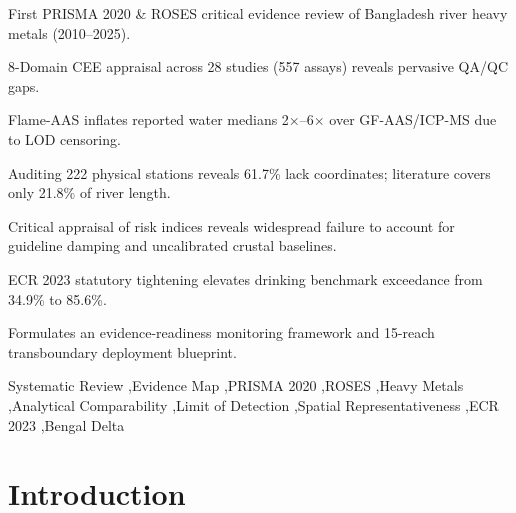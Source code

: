 \documentclass[authoryear,preprint,12pt]{elsarticle}
\begin{document}
\begin{frontmatter}
\begin{abstract}
Finally, we audit compliance under the gazetted \textit{Environmental Conservation Rules 2023} (ECR 2023 Schedule 2), which lowered the statutory drinking threshold for Pb from 0.050 to 0.010~mg/L, surging raw-water drinking benchmark exceedance from 34.9\% to \textbf{85.6\%}. We outline an operational evidence-readiness framework ($RQ5$) and a reach-prioritized 15-sector blueprint for institutional surveillance by the Department of Environment (DoE) and Bangladesh Water Development Board (BWDB).
\end{abstract}

\begin{highlights}
\item First PRISMA 2020 \& ROSES critical evidence review of Bangladesh river heavy metals (2010--2025).
\item 8-Domain CEE appraisal across 28 studies (557 assays) reveals pervasive QA/QC gaps.
\item Flame-AAS inflates reported water medians 2$\times$--6$\times$ over GF-AAS/ICP-MS due to LOD censoring.
\item Auditing 222 physical stations reveals 61.7\% lack coordinates; literature covers only 21.8\% of river length.
\item Critical appraisal of risk indices reveals widespread failure to account for guideline damping and uncalibrated crustal baselines.
\item ECR 2023 statutory tightening elevates drinking benchmark exceedance from 34.9\% to 85.6\%.
\item Formulates an evidence-readiness monitoring framework and 15-reach transboundary deployment blueprint.
\end{highlights}

\begin{keyword}
Systematic Review \sep Evidence Map \sep PRISMA 2020 \sep ROSES \sep Heavy Metals \sep Analytical Comparability \sep Limit of Detection \sep Spatial Representativeness \sep ECR 2023 \sep Bengal Delta
\end{keyword}

\end{frontmatter}

\linenumbers

\section{Introduction}
\end{document}
